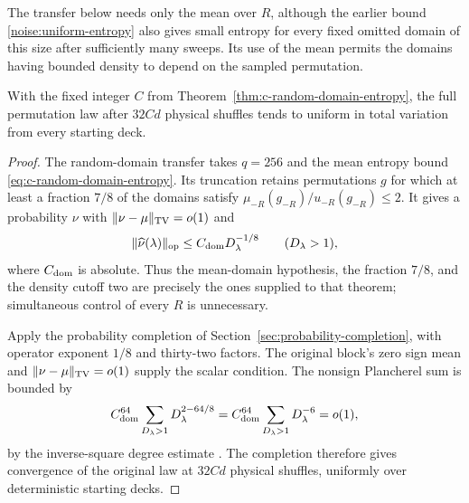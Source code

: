 The transfer below needs only the mean over $R$, although the earlier
bound \eqref{noise:uniform-entropy} also gives small entropy for every
fixed omitted domain of this size after sufficiently many sweeps.
Its use of the mean permits the domains having bounded density to
depend on the sampled permutation.

\begin{corollary}
\label{cor:c-random-domain-mixing}
With the fixed integer $C$ from
Theorem~\ref{thm:c-random-domain-entropy}, the full permutation law after
$32Cd$ physical shuffles tends to uniform in total variation from
every starting deck.
\end{corollary}

\begin{proof}
The random-domain transfer
\cite[Theorem~\ref*{l-l:domain-transfer}]{partialFourier}
takes $q=256$ and the mean entropy bound
\eqref{eq:c-random-domain-entropy}.  Its truncation retains permutations
$g$ for which at least a fraction $7/8$ of the domains satisfy
$\mu_{-R}(g_{-R})/u_{-R}(g_{-R})\le2$.  It gives a probability $\nu$
with $\|\nu-\mu\|_{\rm TV}=o(1)$ and
\[
 \|\widehat\nu(\lambda)\|_{\rm op}
 \le C_{\rm dom}D_\lambda^{-1/8}\qquad(D_\lambda>1),
\]
where $C_{\rm dom}$ is absolute.  Thus the mean-domain hypothesis, the fraction
$7/8$, and the density cutoff two are precisely the ones supplied to
that theorem; simultaneous control of every $R$ is unnecessary.

Apply the probability completion of
Section~\ref{sec:probability-completion}, with operator exponent
$1/8$ and thirty-two factors. The original block's zero sign mean
and $\|\nu-\mu\|_{\rm TV}=o(1)$ supply the scalar condition.
The nonsign Plancherel sum is bounded by
\[
 C_{\rm dom}^{64}\sum_{D_\lambda>1}D_\lambda^{2-64/8}
 =C_{\rm dom}^{64}\sum_{D_\lambda>1}D_\lambda^{-6}=o(1),
\]
by the inverse-square degree estimate
\cite[Lemma~\ref*{l-l:degree-inverse-square}]{partialFourier}.
The completion therefore gives convergence of the original law at
$32Cd$ physical shuffles, uniformly over deterministic starting decks.
\end{proof}
